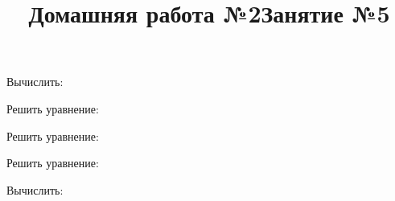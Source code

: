 \newpage
\title{Домашняя работа №2}
\begin{listofex}
	\item Вычислить:
	\begin{enumcols}[itemcolumns=2]
		\item {}
		\item {}
	\end{enumcols}
	\item Решить уравнение:
	\begin{enumcols}[itemcolumns=1]
		\item {}
		\item {}
		\item {}
		\item {}
	\end{enumcols}
	\item Решить уравнение:
	\begin{enumcols}[itemcolumns=2]
		\item {}
		\item {}
		\item {}
	\end{enumcols}
	\item Решить уравнение:
	\begin{enumcols}[itemcolumns=2]
		\item {}
		\item {}
		\item {}
		\item {}
	\end{enumcols}
	\item {}
	\item Вычислить:
	\begin{enumcols}[itemcolumns=1]
		\item {}
		\item {}
		\item {}
		\item {}
	\end{enumcols}
\end{listofex}
\newpage
\title{Занятие №5}
